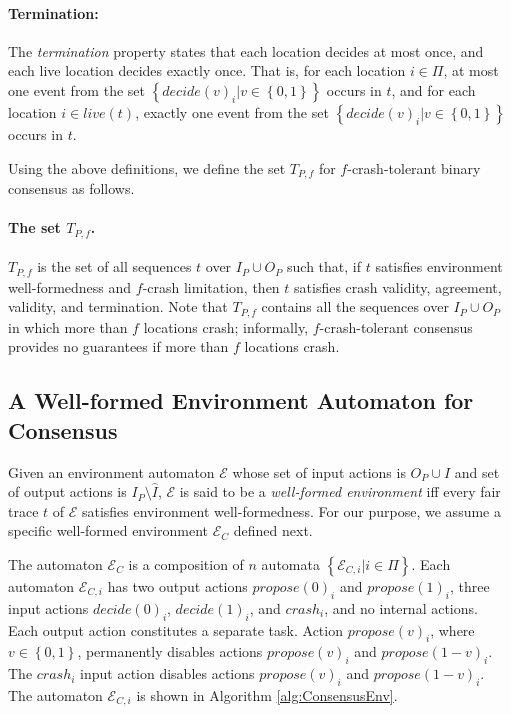 \documentclass[11pt]{article}
\numberwithin{theorem}{section}
\newcommand{\set}[1]{\left\{#1\right\}}
\begin{document}
\paragraph{Termination:} The \emph{termination} property states that each location decides at most once, and each live location decides exactly once. That is, for each location $i \in \Pi$, at most one event from the set $\set{decide(v)_i| v \in \set{0,1}}$ occurs in $t$, and for each location $i \in live(t)$, exactly one event from the set $\set{decide(v)_i| v \in \set{0,1}}$ occurs in $t$. 


Using the above definitions, we define the set $T_{P,f}$ for $f$-crash-tolerant binary consensus as follows.

\paragraph{The set $T_{P,f}$.} $T_{P,f}$ is the set of all sequences $t$ over $I_P \cup O_P$ such that, if $t$ satisfies  environment well-formedness and $f$-crash limitation,
then $t$ satisfies crash validity, agreement, validity, and termination. Note that $T_{P,f}$ contains all the sequences over $I_P \cup O_P$ in which more than $f$ locations crash; informally, $f$-crash-tolerant consensus provides no guarantees if more than $f$ locations crash.


\subsection{A Well-formed Environment Automaton for Consensus}\label{subsec:conEnvDef}
Given an environment automaton $\mathcal{E}$ whose set of input actions is $O_P \cup \hat{I}$ and set of output actions is $I_P\setminus \hat{I}$, $\mathcal{E}$ is said to be a \emph{well-formed environment} iff every fair trace $t$ of $\mathcal{E}$ satisfies environment well-formedness. For our purpose, we assume a specific well-formed environment $\mathcal{E}_C$ defined next.


The automaton $\mathcal{E}_C$ is a composition of $n$ automata $\set{\mathcal{E}_{C,i} | i \in\Pi}$. Each automaton $\mathcal{E}_{C,i}$ has two output actions $propose(0)_i$ and $propose(1)_i$, three input actions $decide(0)_i$, $decide(1)_i$, and $crash_i$, and no internal actions. Each output action constitutes a separate task. Action $propose(v)_i$, where $v \in \set{0,1}$, permanently disables actions $propose(v)_i$ and $propose(1-v)_i$. The $crash_i$ input action disables  actions $propose(v)_i$ and $propose(1-v)_i$. The automaton $\mathcal{E}_{C,i}$ is shown in Algorithm \ref{alg:ConsensusEnv}.
\end{document}
